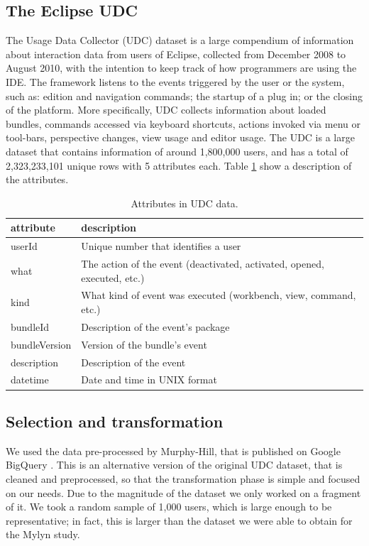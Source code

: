 \documentclass[times]{smrauth}
\begin{document}
\subsection{The Eclipse UDC}
The Usage Data Collector (UDC) dataset is a large compendium of information about interaction data from users of Eclipse, collected from December 2008 to August 2010, with the intention to keep track of how programmers are using the IDE. The framework listens to the events triggered by the user or the system, such as: edition and navigation commands; the startup of a plug in; or the closing of the platform. More specifically, UDC collects information about loaded bundles, commands accessed via keyboard shortcuts, actions invoked via menu or tool-bars, perspective changes, view usage and editor usage. The UDC is a large dataset that contains information of around 1,800,000 users, and has a total of 2,323,233,101 unique rows with 5 attributes each. Table \ref{tbl:att_udc} show a description of the attributes.


\begin{table}[ht!]
\renewcommand{\arraystretch}{1.3}
\caption{Attributes in UDC data. }
\label{tbl:att_udc}
\centering
\begin{tabular}{|p{2.5cm}|p{7cm}|} 
  \hline 
attribute & description \\  
  \hline 
    \hline 
userId &  Unique number that identifies a user \\
what & The action of the event (deactivated, activated, opened, executed, etc.)  \\
kind & What kind of event was executed (workbench, view, command, etc.)  \\
bundleId & Description of the event's package  \\
bundleVersion & Version of the bundle's event  \\
description & Description of the event\\
datetime & Date and time in UNIX format\\
  \hline
\end{tabular}

\end{table}

\subsection{Selection and transformation}
We used the data pre-processed by Murphy-Hill, that is published on Google BigQuery \cite{SnipesETALASD}. This is an alternative version of the original UDC dataset, that is cleaned and preprocessed, so that the transformation phase is simple and focused on our needs. Due to the magnitude of the dataset we only worked on a fragment of it. We took a random sample of 1,000 users, which is large enough to be representative; in fact, this is larger than the dataset we were able to obtain for the Mylyn study.
\end{document}
